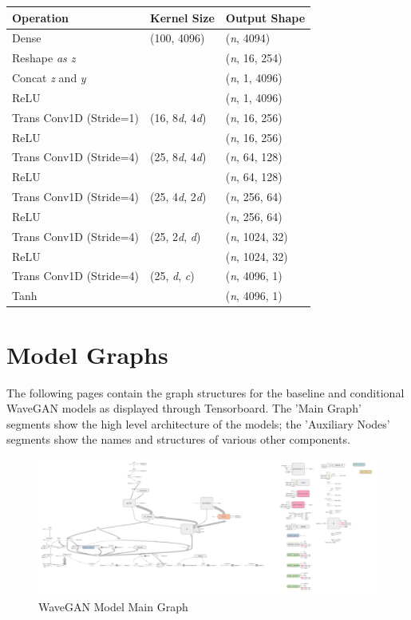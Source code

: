 \documentclass[a4paper, titlepage]{article}
\begin{document}
\begin{appendices}
\begin{table}[ht]
\begin{center}
\begin{tabular}{ l | l | l}
        Operation & Kernel Size & Output Shape \\
        \hline
        Dense & (100, 4096) & ({\it n}, 4094) \\
        Reshape {\it as z} & & ({\it n}, 16, 254) \\
        Concat {\it z} and {\it y} & & ({\it n}, 1, 4096) \\
        ReLU & & ({\it n}, 1, 4096) \\
        Trans Conv1D (Stride=1) & (16, 8{\it d}, 4{\it d}) & ({\it n}, 16, 256) \\
        ReLU & & ({\it n}, 16, 256) \\
        Trans Conv1D (Stride=4) & (25, 8{\it d}, 4{\it d}) & ({\it n}, 64, 128) \\
        ReLU & & ({\it n}, 64, 128) \\
        Trans Conv1D (Stride=4) & (25, 4{\it d}, 2{\it d}) & ({\it n}, 256, 64) \\
        ReLU & & ({\it n}, 256, 64) \\
        Trans Conv1D (Stride=4) & (25, 2{\it d}, {\it d}) & ({\it n}, 1024, 32) \\
        ReLU & & ({\it n}, 1024, 32) \\
        Trans Conv1D (Stride=4) & (25, {\it d}, {\it c}) & ({\it n}, 4096, 1) \\
        Tanh & & ({\it n}, 4096, 1) \\

      \end{tabular}
    \end{center}
    
  \end{table}

  \clearpage

  \section{Model Graphs}

  The following pages contain the graph structures for the baseline and conditional WaveGAN models as displayed through Tensorboard.
  The 'Main Graph' segments show the high level architecture of the models; the 'Auxiliary Nodes' segments show the names and structures of various other components.

  \begin{figure}[ht]
    \caption{WaveGAN Model Main Graph}
    \centering
    \includegraphics[width=1.25\textwidth, angle=90, trim={0 0 55cm 0}, clip]{WGAN}
  \end{figure}
  

\end{appendices}
\end{document}
